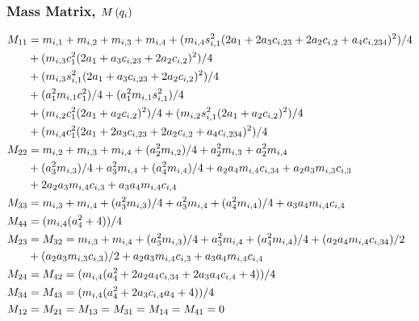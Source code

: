 	\subsubsection{Mass Matrix, $M\left(q_{i}\right)$}
	\vspace{-5mm}
	{
	\begin{equation*}
		\begin{split}\small
		M_{11}  & = m_{i,1} + m_{i,2} + m_{i,3} + m_{i,4} + (m_{i,4} s_{i,1}^2 (2 a_{1} + 2 a_{3} c_{i,23} + 2 a_{2} c_{i,2} + a_{4} c_{i,234})^2)/4 \\
				& + (m_{i,3} c_{1}^2 (2 a_{1} + a_{3} c_{i,23} + 2 a_{2} c_{i,2})^2)/4 \\ 
				& + (m_{i,3} s_{i,1}^2 (2 a_{1} + a_{3} c_{i,23} + 2 a_{2} c_{i,2})^2)/4 \\
				& + (a_{1}^2 m_{i,1} c_{1}^2)/4 + (a_{1}^2 m_{i,1} s_{i,1}^2)/4  \\
				& + (m_{i,2} c_{1}^2 (2 a_{1} + a_{2} c_{i,2})^2)/4 + (m_{i,2} s_{i,1}^2 (2 a_{1} + a_{2} c_{i,2})^2)/4 \\
				& + (m_{i,4} c_{1}^2 (2 a_{1} + 2 a_{3} c_{i,23} + 2 a_{2} c_{i,2} + a_{4} c_{i,234})^2)/4 \\
		M_{22}  & = m_{i,2} + m_{i,3} + m_{i,4} + (a_{2}^2 m_{i,2})/4 + a_{2}^2 m_{i,3} + a_{2}^2 m_{i,4} \\
				& + (a_{3}^2 m_{i,3})/4 + a_{3}^2 m_{i,4} + (a_{4}^2 m_{i,4})/4 + a_{2} a_{4} m_{i,4} c_{i,34} + a_{2} a_{3} m_{i,3} c_{i,3} \\
				& + 2 a_{2} a_{3} m_{i,4} c_{i,3} + a_{3} a_{4} m_{i,4} c_{i,4}\\
		M_{33}  & = m_{i,3} + m_{i,4} + (a_{3}^2 m_{i,3})/4 + a_{3}^2 m_{i,4} + (a_{4}^2 m_{i,4})/4 + a_{3} a_{4} m_{i,4} c_{i,4}\\
		M_{44}  & = (m_{i,4} (a_{4}^2 + 4))/4\\
		M_{23}  & = M_{32} = m_{i,3} + m_{i,4} + (a_{3}^2 m_{i,3})/4 + a_{3}^2 m_{i,4} + (a_{4}^2 m_{i,4})/4 + (a_{2} a_{4} m_{i,4} c_{i,34})/2 \\
				& + (a_{2} a_{3} m_{i,3} c_{i,3})/2 + a_{2} a_{3} m_{i,4} c_{i,3} + a_{3} a_{4} m_{i,4} c_{i,4} \\
		M_{24}  & = M_{42} = (m_{i,4} (a_{4}^2 + 2 a_{2} a_{4} c_{i,34} + 2 a_{3} a_{4} c_{i,4} + 4))/4\\
		M_{34} 	& = M_{43} = (m_{i,4} (a_{4}^2 + 2 a_{3} c_{i,4} a_{4} + 4))/4\\
		M_{12}  & = M_{21} = M_{13}  = M_{31} = M_{14} = M_{41} = 0\\
		\end{split}
	\end{equation*}
	}

